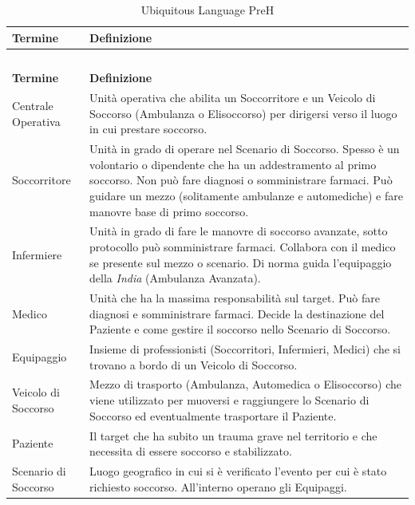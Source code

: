 \documentclass[12pt,a4paper,oneside]{article}
\begin{document}
\begin{longtable}{|l|p{11cm}|}

\caption{Ubiquitous Language PreH} \label{tab:ubiquitous_language} \\

\hline
\textbf{Termine} & \textbf{Definizione} \\
\hline\hline
\endfirsthead

\multicolumn{2}{c}{\tablename\ \thetable{}} \\
\hline
\textbf{Termine} & \textbf{Definizione} \\
\hline\hline
\endhead

\endfoot

\hline
\endlastfoot

Centrale Operativa & Unità operativa che abilita un Soccorritore e un Veicolo di Soccorso (Ambulanza o Elisoccorso) per dirigersi verso il luogo in cui prestare soccorso. \\
\hline
Soccorritore & Unità in grado di operare nel Scenario di Soccorso. Spesso è un volontario o dipendente che ha un addestramento al primo soccorso. Non può fare diagnosi o somministrare farmaci. Può guidare un mezzo (solitamente ambulanze e automediche) e fare manovre base di primo soccorso. \\
\hline
Infermiere & Unità in grado di fare le manovre di soccorso avanzate, sotto protocollo può somministrare farmaci. Collabora con il medico se presente sul mezzo o scenario. Di norma guida l'equipaggio della \textit{India} (Ambulanza Avanzata). \\
\hline
Medico & Unità che ha la massima responsabilità sul target. Può fare diagnosi e somministrare farmaci. Decide la destinazione del Paziente e come gestire il soccorso nello Scenario di Soccorso. \\
\hline
Equipaggio & Insieme di professionisti (Soccorritori, Infermieri, Medici) che si trovano a bordo di un Veicolo di Soccorso. \\
\hline
Veicolo di Soccorso & Mezzo di trasporto (Ambulanza, Automedica o Elisoccorso) che viene utilizzato per muoversi e raggiungere lo Scenario di Soccorso ed eventualmente trasportare il Paziente. \\
\hline
Paziente & Il target che ha subito un trauma grave nel territorio e che necessita di essere soccorso e stabilizzato. \\
\hline
Scenario di Soccorso & Luogo geografico in cui si è verificato l'evento per cui è stato richiesto soccorso. All'interno operano gli Equipaggi. \\

\end{longtable}
\end{document}
